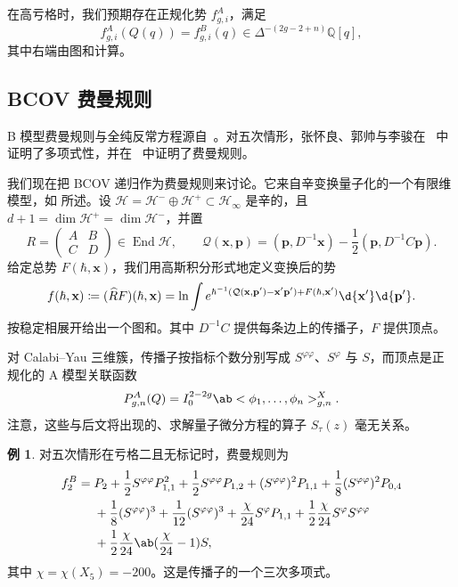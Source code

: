 \documentclass{amsart}
\theoremstyle{definition}
\newtheorem{exm}[thm]{例}
\theoremstyle{remark}
\theoremstyle{plain}
\theoremstyle{definition}
\theoremstyle{remark}
\newcommand{\Q}{\mathbb{Q}}
\newcommand{\mc}[1]{\mathcal{#1}}
\newcommand{\mbf}[1]{\mathbf{#1}}
\newcommand{\bp}{\mbf{p}}
\newcommand{\wh}[1]{\widehat{#1}}
\newcommand{\1}{\mathbf{1}}
\newcommand{\2}{\mathbf{2}}
\newcommand{\3}{\mathbf{3}}
\DeclareMathOperator{\End}{End}
\begin{document}
在高亏格时，我们预期存在正规化势 \(f^A_{g,i}\)，满足
\[ f^A_{g,i}(Q(q)) = f^B_{g,i}(q) \in \Delta^{-(2g-2+n)}\Q[q], \]
其中右端由图和计算。

\subsection{BCOV 费曼规则}%
\label{sub:The BCOV Feynman rule}

B 模型费曼规则与全纯反常方程源自~\cite{BCOV1994}。对五次情形，张怀良、郭帅与李骏在~\cite{CGL2021} 中证明了多项式性，并在~\cite{CGL2026} 中证明了费曼规则。

我们现在把 BCOV 递归作为费曼规则来讨论。它来自辛变换量子化的一个有限维模型，如  所述。设 \(\mc{H} = \mc{H}^- \oplus \mc{H}^+ \subset \mc{H}_{\infty}\) 是辛的，且 \(d+1 = \dim \mc{H}^+ = \dim \mc{H}^-\)，并置
\[ R = \begin{pmatrix} A & B \\ C & D \end{pmatrix} \in \End \mc{H}, \qquad \mc{Q}(\mbf{x},\bp) = (\bp, D^{-1}\mbf{x}) - \frac{1}{2}(\bp, D^{-1}C\bp). \]
给定总势 \(F(\hbar, \mbf{x})\)，我们用高斯积分形式地定义变换后的势
\[ f(\hbar, \mbf{x}) \coloneqq (\wh{R}F)(\hbar,\mbf{x}) = \ln \int e^{\hbar^{-1}(\mc{Q}(\mbf{x},\bp') - \mbf{x}'\bp') + F(\hbar,\mbf{x}')}\d{\mbf{x}'}\d{\bp'}. \]
按稳定相展开给出一个图和。其中 \(D^{-1}C\) 提供每条边上的传播子，\(F\) 提供顶点。

对 Calabi–Yau 三维簇，传播子按指标个数分别写成 \(S^{\varphi\varphi}\)、\(S^{\varphi}\) 与 \(S\)，而顶点是正规化的 A 模型关联函数
\[ P^A_{g,n}(Q) = I_0^{2-2g}\ab<\phi_1, \ldots, \phi_n>^X_{g,n}. \]
注意，这些与后文将出现的、求解量子微分方程的算子 \(S_{\tau}(z)\) 毫无关系。

\begin{exm}
    对五次情形在亏格二且无标记时，费曼规则为
    \begin{align*}
        f_2^B ={}& P_2 + \frac{1}{2}S^{\varphi\varphi}P_{1,1}^2 + \frac{1}{2}S^{\varphi\varphi}P_{1,2} + (S^{\varphi\varphi})^2 P_{1,1} + \frac{1}{8}(S^{\varphi\varphi})^2 P_{0,4} \\
        &+ \frac{1}{8}(S^{\varphi\varphi})^3 + \frac{1}{12}(S^{\varphi\varphi})^3 + \frac{\chi}{24}S^{\varphi}P_{1,1} + \frac{1}{2}\frac{\chi}{24}S^{\varphi}S^{\varphi\varphi} \\
        &+ \frac{1}{2}\frac{\chi}{24}\ab(\frac{\chi}{24}-1)S,
    \end{align*}
    其中 \(\chi = \chi(X_5) = -200\)。这是传播子的一个三次多项式。
\end{exm}
\end{document}
